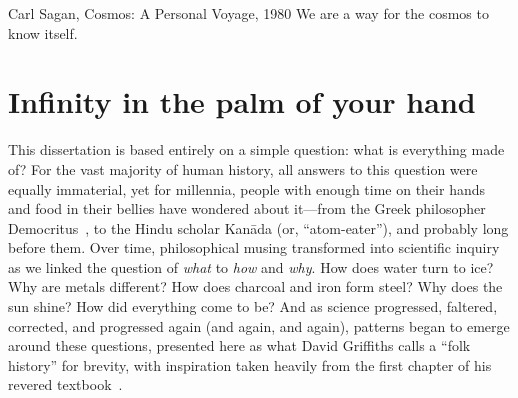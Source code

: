 \begin{dissertationintroduction}
\begin{aquote}{Carl Sagan, Cosmos: A Personal Voyage, 1980}
    We are a way for the cosmos to know itself.
\end{aquote}

\section*{Infinity in the palm of your hand}
This dissertation is based entirely on a simple question: what is everything made of? 
For the vast majority of human history, all answers to this question were equally immaterial, yet for millennia, people with enough time on their hands and food in their bellies have wondered about it---from the Greek philosopher Democritus~\cite{Taylor1419554}, to the Hindu scholar Kan\=ada (or, ``atom-eater''), and probably long before them. 
Over time, philosophical musing transformed into scientific inquiry as we linked the question of \textit{what} to \textit{how} and \textit{why}. 
How does water turn to ice? 
Why are metals different? 
How does charcoal and iron form steel? 
Why does the sun shine? 
How did everything come to be? 
And as science progressed, faltered, corrected, and progressed again (and again, and again), patterns began to emerge around these questions, presented here as what David Griffiths calls a ``folk history'' for brevity, with inspiration taken heavily from the first chapter of his revered textbook~\cite{GriffithsParticle}.  


\end{dissertationintroduction}
